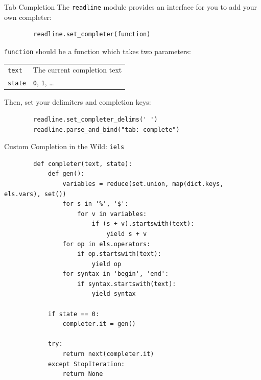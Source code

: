 \documentclass[aspectratio=1610]{beamer}
\begin{document}
\begin{frame}[fragile]{Tab Completion}
    The \texttt{readline} module provides an interface for you to add your own
    completer:

    \begin{verbatim}
        readline.set_completer(function)
    \end{verbatim}

    \texttt{function} should be a function which takes two
    parameters:

    \begin{tabular}{l l}
        \texttt{text} & The current completion text \\
        \texttt{state} & \texttt{0}, \texttt{1}, \ldots \\
    \end{tabular}

    \pause

    Then, set your delimiters and completion keys:
    \begin{verbatim}
        readline.set_completer_delims(' ')
        readline.parse_and_bind("tab: complete")
    \end{verbatim}
\end{frame}

\begin{frame}[fragile]{Custom Completion in the Wild: \texttt{iels}}
    \fontsize{9pt}{10pt}\selectfont
    \begin{verbatim}
        def completer(text, state):
            def gen():
                variables = reduce(set.union, map(dict.keys, els.vars), set())
                for s in '%', '$':
                    for v in variables:
                        if (s + v).startswith(text):
                            yield s + v
                for op in els.operators:
                    if op.startswith(text):
                        yield op
                for syntax in 'begin', 'end':
                    if syntax.startswith(text):
                        yield syntax

            if state == 0:
                completer.it = gen()

            try:
                return next(completer.it)
            except StopIteration:
                return None
    \end{verbatim}
\end{frame}
\end{document}

